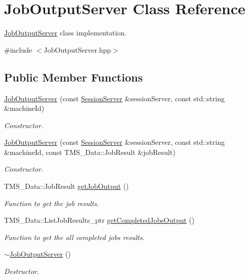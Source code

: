 \hypertarget{classJobOutputServer}{
\section{JobOutputServer Class Reference}
\label{classJobOutputServer}
}


\hyperlink{classJobOutputServer}{JobOutputServer} class implementation.  




{\ttfamily \#include $<$JobOutputServer.hpp$>$}

\subsection*{Public Member Functions}
\begin{DoxyCompactItemize}
\item 
\hyperlink{classJobOutputServer_a7093321f66f882ee0ce050c466821779}{JobOutputServer} (const \hyperlink{classSessionServer}{SessionServer} \&sessionServer, const std::string \&machineId)
\begin{DoxyCompactList}\small\item\em Constructor. \item\end{DoxyCompactList}\item 
\hyperlink{classJobOutputServer_a7dce595df4bd0e52533cd3c0b57a5ba9}{JobOutputServer} (const \hyperlink{classSessionServer}{SessionServer} \&sessionServer, const std::string \&machineId, const TMS\_\-Data::JobResult \&jobResult)
\begin{DoxyCompactList}\small\item\em Constructor. \item\end{DoxyCompactList}\item 
TMS\_\-Data::JobResult \hyperlink{classJobOutputServer_abe73e8c2b4f274f1e58f2955e6b132c7}{getJobOutput} ()
\begin{DoxyCompactList}\small\item\em Function to get the job results. \item\end{DoxyCompactList}\item 
TMS\_\-Data::ListJobResults\_\-ptr \hyperlink{classJobOutputServer_a35f5427690f05f53b574da3585d878c9}{getCompletedJobsOutput} ()
\begin{DoxyCompactList}\small\item\em Function to get the all completed jobs results. \item\end{DoxyCompactList}\item 
\hypertarget{classJobOutputServer_a77adf82f3387f2386f409e02cd5f6d25}{
\hyperlink{classJobOutputServer_a77adf82f3387f2386f409e02cd5f6d25}{$\sim$JobOutputServer} ()}
\label{classJobOutputServer_a77adf82f3387f2386f409e02cd5f6d25}

\begin{DoxyCompactList}\small\item\em Destructor. \item\end{DoxyCompactList}\end{DoxyCompactItemize}
